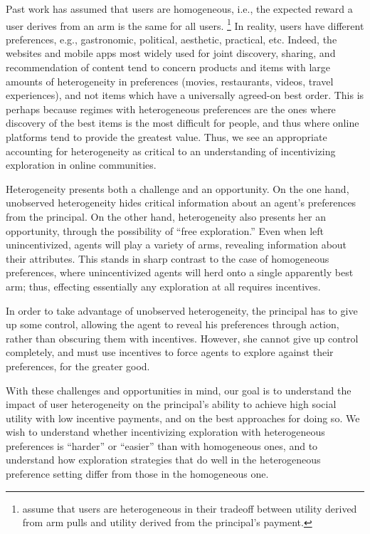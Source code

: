 Past work has assumed that users are homogeneous, i.e., the expected
reward a user derives from an arm is the same for all users.%
\footnote{\citet{han2015incentivizing} assume that users are
heterogeneous in their tradeoff between utility derived from arm pulls
and utility derived from the principal's payment.}
In reality, users have different preferences, e.g., gastronomic,
political, aesthetic, practical, etc.
Indeed, the websites and mobile apps most widely used for joint discovery,
sharing, and recommendation of content tend to concern products and items 
with large amounts of heterogeneity in preferences (movies, restaurants,
videos, travel experiences), and not items which have a universally
agreed-on best order.
This is perhaps because regimes with heterogeneous preferences are the
ones where discovery of the best items is the most difficult for people, 
and thus where online
platforms tend to provide the greatest value.  Thus, we see an appropriate
accounting for heterogeneity as critical to an understanding of incentivizing
exploration in online communities.

Heterogeneity presents both a challenge and an opportunity.
On the one hand, unobserved heterogeneity hides critical
information about an agent's preferences from the principal.
On the other hand, heterogeneity also presents her an opportunity,
through the possibility of ``free exploration.''
Even when left unincentivized, agents will
play a variety of arms, revealing information about their attributes.
This stands in sharp contrast to the case of homogeneous preferences,
where unincentivized agents will herd onto a single apparently best arm;
thus, effecting essentially any exploration at all requires incentives.

In order to take advantage of unobserved heterogeneity,
the principal has to give up some control, allowing the agent to
reveal his preferences through action, rather than obscuring them with
incentives.
However, she cannot give up control completely,
and must use incentives to force agents to explore against their
preferences, for the greater good. 

With these challenges and opportunities in mind, our goal is to understand the
impact of user heterogeneity on the principal's ability to achieve
high social utility with low incentive payments,
and on the best approaches for doing so.
We wish to understand whether incentivizing exploration with
heterogeneous preferences  is ``harder'' or ``easier'' than with
homogeneous ones,
and to understand how exploration strategies that do well in the
heterogeneous preference setting differ from those in the homogeneous one.

